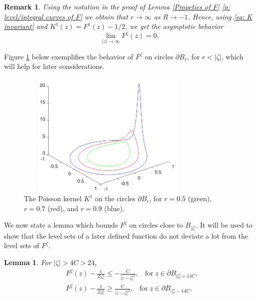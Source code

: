 \documentclass[11pt]{article}
\numberwithin{equation}{section}
\newtheorem{lemma}[theorem]{Lemma}
\newtheorem*{remark}{Remark}
\begin{document}
\begin{remark}
  Using the notation in the proof of 
  Lemma \ref{Propeties of F} \ref{p: level/integral curves of F} we 
  obtain that $r \rightarrow \infty$ as $R \rightarrow -1$. 
  Hence, using \eqref{eq: K invariant} and $K^1(z) = F^1(z) - 1/2$,
  we get the asymptotic behavior 
  $$\lim_{|z| \rightarrow \infty} F^{\zeta}(z) = 0.$$ 
\end{remark}

Figure \ref{F: F^zeta} below exemplifies the behavior of $F^{\zeta}$ 
on circles $\partial B_r$, for $r < |\zeta|$, 
which will help for later considerations. 
\begin{figure}[H]
  \captionsetup{width=.75\linewidth}
  \includegraphics[width=9cm, height=6cm]{FzetaOnCircles.png}
  \centering
  \caption{The Poisson kernel $K^{1}$ on the circles 
    $\partial B_r$, for $r = 0.5$ (green), $r=0.7$ (red), and $r=0.9$ (blue).}
  \label{F: F^zeta}
\end{figure}
\vspace*{-4mm}
We now state a lemma which bounds $F^{\zeta}$ 
on circles close to $B_{|\zeta|}$. It 
will be used to show that the level sets of 
a later defined function do not 
deviate a lot from the level sets of $F^{\zeta}$.

\begin{lemma} \label{L: F on B_zeta+14C}
  For $|\zeta| > 4C>24$,
  \begin{equation}\nonumber
    \begin{split}
      &F^{\zeta}(z) - \frac{1}{2 |\zeta|} 
      \leq - \frac{C}{|z - \zeta|^2}, 
      \;\;\;\text{for}\; z \in \partial B_{|\zeta| + 14C},\\
      &F^{\zeta}(z) - \frac{1}{2 |\zeta|} 
        \geq \frac{C}{|z - \zeta|^2}, \;\;\;
        \text{for}\; z \in \partial B_{|\zeta| - 14C}.
      \end{split}
    \end{equation} 
\end{lemma}
\end{document}
